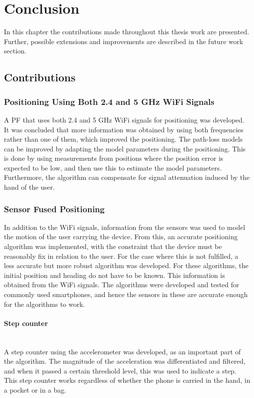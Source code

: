 \documentclass{LTHthesis}
\begin{document}
\chapter{Conclusion}
%
In this chapter the contributions made throughout this thesis work are presented. Further, possible extensions and improvements are described in the future work section.
%
\label{chap:conclusion}

\section{Contributions}

\subsection{Positioning Using Both 2.4 and 5 GHz WiFi Signals}
A PF that uses both 2.4 and 5 GHz WiFi signals for positioning was developed. It was concluded that more information was obtained by using both frequencies rather than one of them, which improved the positioning. The path-loss models can be improved by adapting the model parameters during the positioning. This is done by using measurements from positions where the position error is expected to be low, and then use this to estimate the model parameters. Furthermore, the algorithm can compensate for signal attenuation induced by the hand of the user.

\subsection{Sensor Fused Positioning}
In addition to the WiFi signals, information from the sensors was used to model the motion of the user carrying the device. From this, an accurate positioning algorithm was implemented, with the constraint that the device must be reasonably fix in relation to the user. For the case where this is not fulfilled, a less accurate but more robust algorithm was developed. For these algorithms, the initial position and heading do not have to be known. This information is obtained from the WiFi signals. The algorithms were developed and tested for commonly used smartphones, and hence the sensors in these are accurate enough for the algorithms to work.

\subsubsection{Step counter} ~\\
A step counter using the accelerometer was developed, as an important part of the algorithm. The magnitude of the acceleration was differentiated and filtered, and when it passed a certain threshold level, this was used to indicate a step. This step counter works regardless of whether the phone is carried in the hand, in a pocket or in a bag. 
\end{document}
